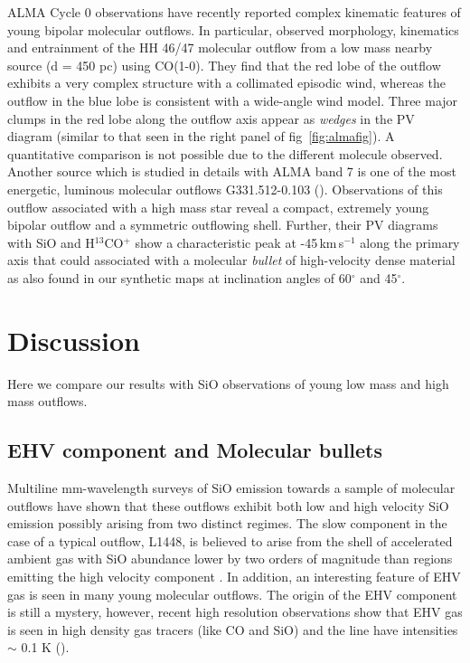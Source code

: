 \documentclass[useAMS,usenatbib]{mn2e}
\begin{document}
ALMA Cycle 0 observations have recently reported complex kinematic
features of young bipolar molecular outflows. In particular,
\cite{Arce:2013p14902} observed morphology, kinematics and entrainment 
of the HH 46/47 molecular outflow from a low mass nearby
source (d = 450 pc) using CO(1-0). They find that the red
lobe of the outflow exhibits a very complex structure with a
collimated episodic wind, whereas the outflow in the blue lobe is
consistent with a
wide-angle wind model. Three major clumps in the red lobe along the
outflow axis appear as {\em{wedges}} in the PV
diagram (similar to that seen in the right panel of fig~\ref{fig:almafig}). 
A quantitative comparison is not possible due to the different
molecule observed. Another source which is studied in details with ALMA band 7 is
one of the most energetic, luminous molecular outflows
G331.512-0.103 (\citealt{Merello:2013p15066}). Observations of this outflow
associated with a high mass star reveal a compact, extremely young
bipolar outflow and a symmetric outflowing shell. Further, their PV
diagrams with SiO and H$^{13}$CO$^{+}$ show a characteristic peak at
-45\,km\,s$^{-1}$ along the primary axis that could associated with a 
molecular {\em bullet} of high-velocity dense material as also found in our
synthetic maps at inclination angles of 60$^{\circ}$ and 45$^{\circ}$.

 
\section{Discussion}
\label{sec:discussion}
Here we compare our results with SiO observations of young low
mass and high mass outflows.

\subsection{EHV component and Molecular bullets}
\label{ssec:EHV}
Multiline mm-wavelength surveys of SiO emission towards a sample of molecular
outflows have shown that these outflows exhibit both low and high
velocity SiO emission possibly arising from two distinct regimes. The slow
component in the case of a typical outflow, L1448, is believed to arise from
the shell of accelerated ambient gas with SiO abundance
lower by two orders of magnitude than regions emitting the high
velocity component
\cite{Codella:1999p12584}. In addition, an interesting feature of EHV
gas is seen in many young molecular outflows. The origin of the EHV
component is still a mystery, however, recent high resolution
observations show that EHV gas is seen in
high density gas tracers (like CO and SiO) and the line have
intensities $\sim$ 0.1 K (\citealt{Tafalla:2010p14759}).
%
\end{document}

